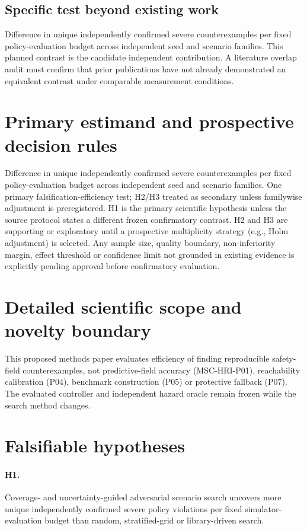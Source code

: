 \documentclass[11pt,a4paper]{article}
\begin{document}
\subsection{Specific test beyond existing work}
Difference in unique independently confirmed severe counterexamples per fixed policy-evaluation budget across independent seed and scenario families. This planned contrast is the candidate independent contribution. A literature overlap audit must confirm that prior publications have not already demonstrated an equivalent contrast under comparable measurement conditions.

\section{Primary estimand and prospective decision rules}
Difference in unique independently confirmed severe counterexamples per fixed policy-evaluation budget across independent seed and scenario families. One primary falsification-efficiency test; H2/H3 treated as secondary unless familywise adjustment is preregistered. H1 is the primary scientific hypothesis unless the source protocol states a different frozen confirmatory contrast. H2 and H3 are supporting or exploratory until a prospective multiplicity strategy (e.g., Holm adjustment) is selected. Any sample size, quality boundary, non-inferiority margin, effect threshold or confidence limit not grounded in existing evidence is explicitly pending approval before confirmatory evaluation.

\section{Detailed scientific scope and novelty boundary}
This proposed methods paper evaluates efficiency of finding reproducible safety-field counterexamples, not predictive-field accuracy (MSC-HRI-P01), reachability calibration (P04), benchmark construction (P05) or protective fallback (P07). The evaluated controller and independent hazard oracle remain frozen while the search method changes.

\section{Falsifiable hypotheses}
\paragraph{H1.} Coverage- and uncertainty-guided adversarial scenario search uncovers more unique independently confirmed severe policy violations per fixed simulator-evaluation budget than random, stratified-grid or library-driven search.
\end{document}
